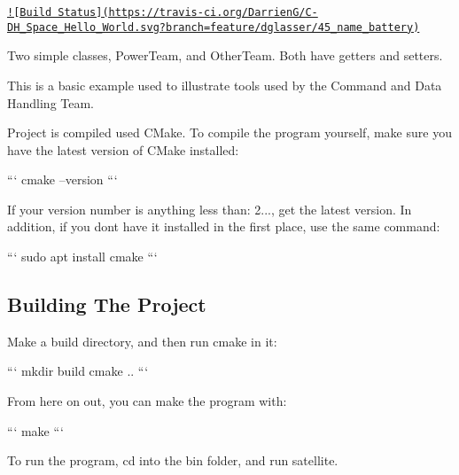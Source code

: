 \href{https://travis-ci.org/DarrienG/C-DH_Space_Hello_World}{\tt !\mbox{[}Build Status\mbox{]}(https\+://travis-\/ci.\+org/\+Darrien\+G/\+C-\/\+D\+H\+\_\+\+Space\+\_\+\+Hello\+\_\+\+World.\+svg?branch=feature/dglasser/45\+\_\+name\+\_\+battery)}

Two simple classes, Power\+Team, and Other\+Team. Both have getters and setters.

This is a basic example used to illustrate tools used by the Command and Data Handling Team.

Project is compiled used C\+Make. To compile the program yourself, make sure you have the latest version of C\+Make installed\+:

``` cmake --version ```

If your version number is anything less than\+: 2..., get the latest version. In addition, if you don\textquotesingle{}t have it installed in the first place, use the same command\+:

``` sudo apt install cmake ```

\subsection*{Building The Project}

Make a build directory, and then run cmake in it\+:

``` mkdir build cmake .. ```

From here on out, you can make the program with\+:

``` make ```

To run the program, cd into the bin folder, and run satellite. 